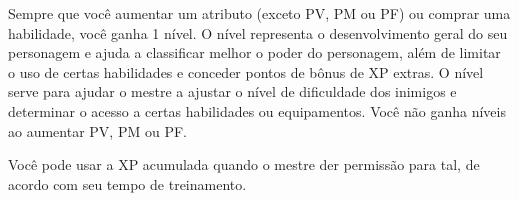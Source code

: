 
Sempre que você aumentar um atributo (exceto PV, PM ou PF) ou comprar uma habilidade, você ganha 1 nível. O nível representa o desenvolvimento geral do seu personagem e ajuda a classificar melhor o poder do personagem, além de limitar o uso de certas habilidades e conceder pontos de bônus de XP extras. O nível serve para ajudar o mestre a ajustar o nível de dificuldade dos inimigos e determinar o acesso a certas habilidades ou equipamentos. Você não ganha níveis ao aumentar PV, PM ou PF.

Você pode usar a XP acumulada quando o mestre der permissão para tal, de acordo com seu tempo de treinamento. 





